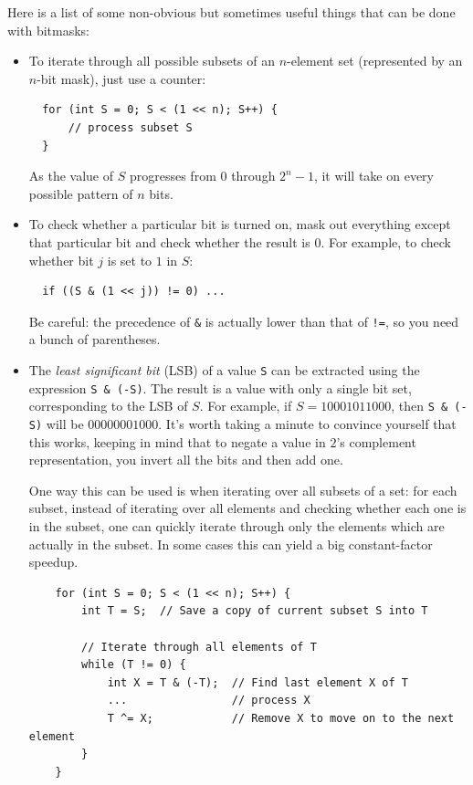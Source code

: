 \documentclass[10pt]{book}
\begin{document}
Here is a list of some non-obvious but sometimes useful things that
can be done with bitmasks:

\begin{itemize}
\item To iterate through all possible subsets of an $n$-element set
  (represented by an $n$-bit mask), just use a counter:
\begin{verbatim}
  for (int S = 0; S < (1 << n); S++) {
      // process subset S
  }
\end{verbatim}
As the value of $S$ progresses from $0$ through $2^n - 1$, it will
take on every possible pattern of $n$ bits.

\item To check whether a particular bit is turned on, mask out
  everything except that particular bit and check whether the result
  is $0$.  For example, to check whether bit $j$ is set to $1$ in $S$:
\begin{verbatim}
  if ((S & (1 << j)) != 0) ...
\end{verbatim}
  Be careful: the precedence of \verb|&| is actually lower than that of
  \verb|!=|, so you need a bunch of parentheses.

\item The \emph{least significant bit} (LSB) of a value \texttt{S} can
  be extracted using the expression \verb|S & (-S)|.  The result is a
  value with only a single bit set, corresponding to the LSB of $S$.
  For example, if $S = 10001011000$, then \verb|S & (-S)| will be
  $00000001000$.  It's worth taking a minute to convince yourself that
  this works, keeping in mind that to negate a value in $2$'s
  complement representation, you invert all the bits and then add one.

  One way this can be used is when iterating over all subsets of a
  set: for each subset, instead of iterating over all elements and
  checking whether each one is in the subset, one can quickly iterate
  through only the elements which are actually in the subset.  In some
  cases this can yield a big constant-factor speedup.
  \begin{verbatim}
    for (int S = 0; S < (1 << n); S++) {
        int T = S;  // Save a copy of current subset S into T

        // Iterate through all elements of T
        while (T != 0) {
            int X = T & (-T);  // Find last element X of T
            ...                // process X
            T ^= X;            // Remove X to move on to the next element
        }
    }
  \end{verbatim}


\end{itemize}
\end{document}
